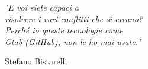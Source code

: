 \newlength\longest

\clearpage

\thispagestyle{empty}
\null\vfill

\settowidth{}
\begin{center}
    \parbox{\longest}{%
        \raggedright{\LARGE\itshape%
            "E voi siete capaci a\\
            risolvere i vari conflitti che si creano?\\
            Perché io queste tecnologie come\\
            Gtab (GitHub), non le ho mai usate."\par\bigskip
        }
        \raggedleft\Large{Stefano Bistarelli}\par%
    }
\end{center}


\vfill\vfill

\clearpage